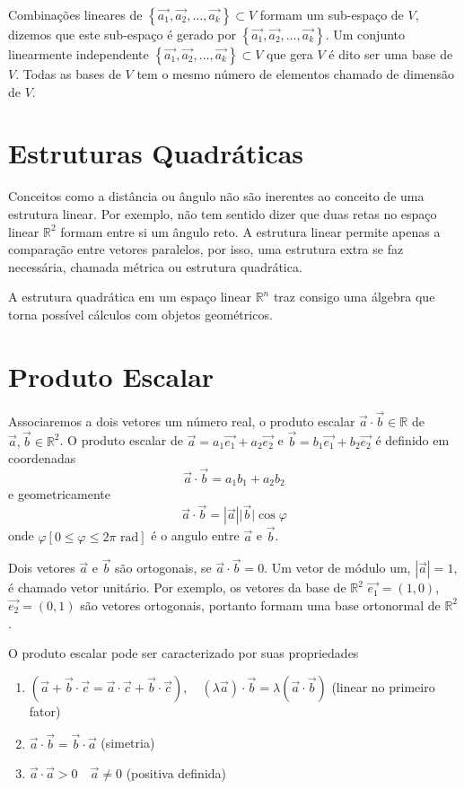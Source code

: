 \documentclass[12pt, oneside, a4paper, english, brazil]{abntex2}
\providecommand{\abs}[1]{\left\vert #1 \right\vert}
\providecommand{\p}[1]{\left( #1 \right)}
\providecommand{\chaves}[1]{\left\{ #1 \right\}}
\providecommand{\colchetes}[1]{\left[ #1 \right]}
\providecommand{\R}{\mathbb{R}}
\providecommand{\Rdois}{\mathbb{R}^2}
\providecommand{\rad}{\text{ rad}}
\renewcommand{\vec}{\overrightarrow}
\theoremstyle{normal}
\theoremstyle{observacao}
\begin{document}
Combinações lineares de $\chaves{\vec{a_1}, \vec{a_2}, \ldots, \vec{a_k}} \subset V$ formam um sub-espaço de $V$, dizemos que este sub-espaço é gerado por $\chaves{\vec{a_1}, \vec{a_2}, \ldots, \vec{a_k}}$. Um conjunto linearmente independente $\chaves{\vec{a_1}, \vec{a_2}, \ldots, \vec{a_k}} \subset V$ que gera $V$ é dito ser uma base de $V$. Todas as bases de $V$ tem o mesmo número de elementos chamado de dimensão de $V$.

\section{Estruturas Quadráticas}\label{estruturasquadraticas}

Conceitos como a distância ou ângulo não são inerentes ao conceito de uma estrutura linear. Por exemplo, não tem sentido dizer que duas retas no espaço linear $\Rdois$ formam entre si um ângulo reto. A estrutura linear permite apenas a comparação entre vetores paralelos, por isso, uma estrutura extra se faz necessária, chamada métrica ou estrutura quadrática.

A estrutura quadrática em um espaço linear $\R^n$ traz consigo uma álgebra que torna possível cálculos com objetos geométricos.

\section{Produto Escalar}

Associaremos a dois vetores um número real, o produto escalar $\vec{a} \cdot \vec{b} \in \R$ de $\vec{a}, \vec{b} \in \Rdois$. O produto escalar de $\vec{a} = a_1\vec{e_1}+a_2\vec{e_2}$ e $\vec{b}=b_1\vec{e_1}+b_2\vec{e_2}$ é definido em coordenadas
\[
\vec{a} \cdot \vec{b} = a_1b_1+a_2b_2
\]
e geometricamente
\[
\vec{a} \cdot \vec{b} = \abs{\vec{a}}\lvert\vec{b}\rvert \cos \varphi
\]
onde $\varphi \colchetes{0\leq \varphi \leq 2\pi \rad}$ é o angulo entre $\vec{a}$ e $\vec{b}$. 

Dois vetores $\vec{a}$ e $\vec{b}$ são ortogonais, se $\vec{a} \cdot \vec{b} = 0$. Um vetor de módulo um, $\abs{\vec{a}}=1$, é chamado vetor unitário. Por exemplo, os vetores da base de $\Rdois$ $\vec{e_1} = \p{1,0}$, $\vec{e_2}= \p{0,1}$ são vetores ortogonais, portanto formam uma base ortonormal de $\Rdois$.

O produto escalar pode ser caracterizado por suas propriedades
\begin{enumerate}
\item $\p{\vec{a}+\vec{b}\cdot\vec{c}=\vec{a}\cdot\vec{c}+\vec{b}\cdot\vec{c}}, \quad \p{\lambda\vec{a}}\cdot\vec{b}=\lambda\p{\vec{a}\cdot\vec{b}}$ (linear no primeiro fator)
\item $\vec{a}\cdot\vec{b}=\vec{b}\cdot\vec{a}$ (simetria)
\item $\vec{a}\cdot\vec{a} > 0 \quad \vec{a}\neq0$ (positiva definida)
\end{enumerate}
\end{document}
